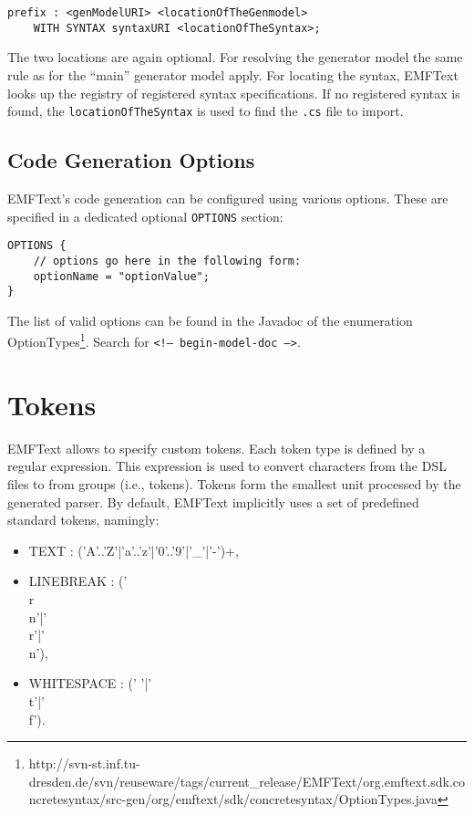 \begin{lstlisting}
prefix : <genModelURI> <locationOfTheGenmodel> 
    WITH SYNTAX syntaxURI <locationOfTheSyntax>;
\end{lstlisting}

The two locations are again optional. For resolving the generator model the same
rule as for the ``main'' generator model apply. For locating the syntax, EMFText
looks up the registry of registered syntax specifications. If no registered
syntax is found, the \texttt{locationOfTheSyntax} is used to find the
\texttt{.cs} file to import.

\subsection{Code Generation Options}

EMFText's code generation can be configured using various options. These are
specified in a dedicated optional \texttt{OPTIONS} section:

\begin{lstlisting}
OPTIONS {
    // options go here in the following form:
    optionName = "optionValue";
}
\end{lstlisting}

The list of valid options can be found in the Javadoc of the enumeration
OptionTypes\footnote{http://svn-st.inf.tu-dresden.de/svn/reuseware/tags/current\_release/EMFText/org.emftext.sdk.concretesyntax/src-gen/org/emftext/sdk/concretesyntax/OptionTypes.java}.
Search for \texttt{<!-- begin-model-doc -->}.

\section{Tokens}

EMFText allows to specify custom tokens. Each token type is defined by a regular
expression. This expression is used to convert characters from the DSL files
to from groups (i.e., tokens). Tokens form the smallest unit processed by the
generated parser. By default, EMFText implicitly uses a set of
predefined standard tokens, namingly:

\begin{itemize}
  \item TEXT : ('A'..'Z'|'a'..'z'|'0'..'9'|'\_'|'-')+,
  \item LINEBREAK : ('\\r\\n'|'\\r'|'\\n'),
  \item WHITESPACE : (' '|'\\t'|'\\f').
\end{itemize}

